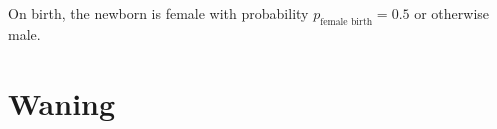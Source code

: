 \documentclass[12pt]{article}
\newcommand{\md}{\mathrm{d}}
\begin{document}



On birth, the newborn is female with probability
$p_{\text{female birth}} = 0.5$ or otherwise male.


\section{Waning}
\end{document}
